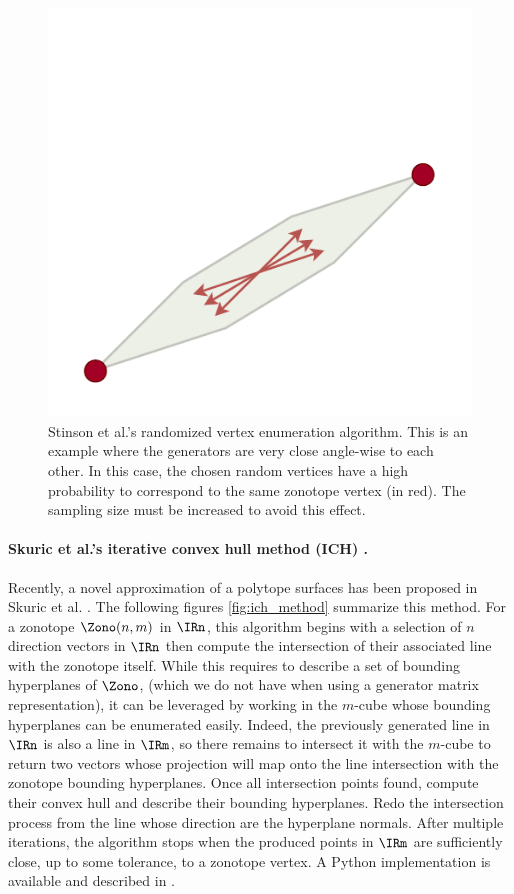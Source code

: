 \begin{figure}[!htb]
    \captionsetup{justification=centering}
    \centering
    \includegraphics[trim={0 0 0 80},clip, width=0.5\linewidth]{img/chapter_2/stinson_algo_fail.pdf}
    
    \caption{Stinson et al.'s randomized vertex enumeration algorithm. This is an example where the generators are very close angle-wise to each other. In this case, the chosen random vertices have a high probability to correspond to the same zonotope vertex (in red). The sampling size must be increased to avoid this effect.}
    \label{fig:stinson_fail}
\end{figure}

\paragraph*{Skuric et al.'s iterative convex hull method (ICH) \cite{skuricOnLineFeasibleWrench2022}.}
Recently, a novel approximation of a polytope surfaces has been proposed in Skuric et al. \cite{skuricOnLineFeasibleWrench2022}. The following figures \ref{fig:ich_method} summarize this method. For a zonotope $\Zono(n,m)$ in $\IRn$, this algorithm begins with a selection of $n$ direction vectors in $\IRn$ then compute the intersection of their associated line with the zonotope itself. While this requires to describe a set of bounding hyperplanes of $\Zono$, (which we do not have when using a generator matrix representation), it can be leveraged by working in the $m$-cube whose bounding hyperplanes can be enumerated easily. Indeed, the previously generated line in $\IRn$ is also a line in $\IRm$, so there remains to intersect it with the $m$-cube to return two vectors whose projection will map onto the line intersection with the zonotope bounding hyperplanes. Once all intersection points found, compute their convex hull and describe their bounding hyperplanes. Redo the intersection process from the line whose direction are the hyperplane normals. After multiple iterations, the algorithm stops when the produced points in $\IRm$ are sufficiently close, up to some tolerance, to a zonotope vertex.
A Python implementation is available and described in \cite{skuricPycapacityRealtimeTaskspace2023}.

